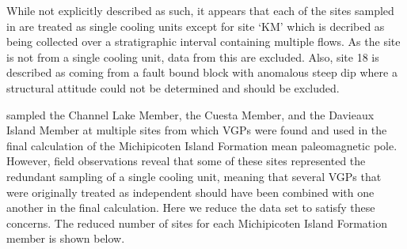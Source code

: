 \documentclass{article}
\begin{document}
While not explicitly described as such, it appears that each of the
sites sampled in \cite{Palmer1987a} are treated as single cooling
units except for site `KM' which is decribed as being collected over a
stratigraphic interval containing multiple flows. As the site is not
from a single cooling unit, data from this are excluded. Also, site 18
is described as coming from a fault bound block with anomalous steep dip
where a structural attitude could not be determined and should be
excluded.

\cite{Palmer1987a} sampled the Channel Lake Member, the Cuesta
Member, and the Davieaux Island Member at multiple sites from which VGPs
were found and used in the final calculation of the Michipicoten Island
Formation mean paleomagnetic pole. However, field observations reveal
that some of these sites represented the redundant sampling of a single
cooling unit, meaning that several VGPs that were originally treated as
independent should have been combined with one another in the final
calculation. Here we reduce the \cite{Palmer1987a} data set to
satisfy these concerns. The reduced number of sites for each
Michipicoten Island Formation member is shown below.
\end{document}

